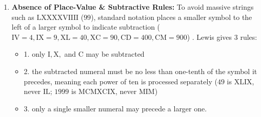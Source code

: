 \documentclass[11pt, a4paper]{article}
\begin{document}
\begin{enumerate}
    \item \textbf{Absence of Place-Value \& Subtractive Rules:} To avoid massive strings such as $\text{LXXXXVIIII}$ ($99$), standard notation places a smaller symbol to the left of a larger symbol to indicate subtraction ($\text{IV}=4, \text{IX}=9, \text{XL}=40, \text{XC}=90, \text{CD}=400, \text{CM}=900$) \cite{geeksforgeeks2021, lewis2019}. Lewis \cite{lewis2019} gives 3 rules:
    \begin{itemize}
        \item  1. only $\text{I}, \text{X},$ and $\text{C}$ may be subtracted
        \item   2. the subtracted numeral must be no less than one-tenth of the symbol it precedes, meaning each power of ten is processed separately ($49$ is $\text{XLIX}$, never $\text{IL}$; $1999$ is $\text{MCMXCIX}$, never $\text{MIM}$)
        \item 3. only a single smaller numeral may precede a larger one.
    \end{itemize}
    

\end{enumerate}
\end{document}
